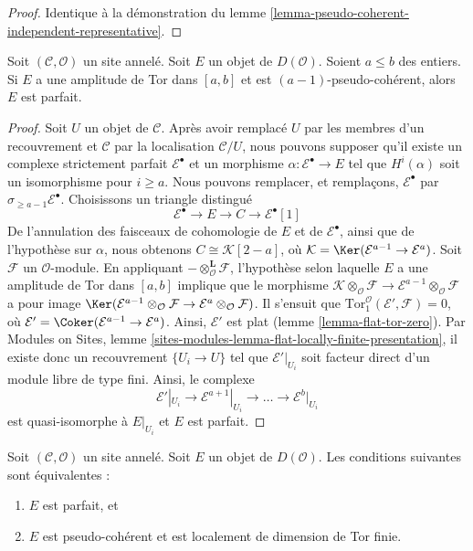 \begin{proof}
Identique à la démonstration du lemme
\ref{lemma-pseudo-coherent-independent-representative}.
\end{proof}

\begin{lemma}
\label{lemma-perfect-precise}
Soit $(\mathcal{C}, \mathcal{O})$ un site annelé. Soit $E$ un objet de
$D(\mathcal{O})$. Soient $a \leq b$ des entiers. Si $E$ a une amplitude de
Tor dans $[a, b]$ et est $(a - 1)$-pseudo-cohérent, alors $E$ est parfait.
\end{lemma}

\begin{proof}
Soit $U$ un objet de $\mathcal{C}$. Après avoir remplacé $U$ par les membres
d'un recouvrement et $\mathcal{C}$ par la localisation $\mathcal{C}/U$, nous
pouvons supposer qu'il existe un complexe strictement parfait
$\mathcal{E}^\bullet$ et un morphisme
$\alpha : \mathcal{E}^\bullet \to E$ tel que $H^i(\alpha)$ soit un
isomorphisme pour $i \geq a$. Nous pouvons remplacer, et remplaçons,
$\mathcal{E}^\bullet$ par $\sigma_{\geq a - 1}\mathcal{E}^\bullet$.
Choisissons un triangle distingué
$$
\mathcal{E}^\bullet \to E \to C \to \mathcal{E}^\bullet[1]
$$
De l'annulation des faisceaux de cohomologie de $E$ et de
$\mathcal{E}^\bullet$, ainsi que de l'hypothèse sur $\alpha$, nous obtenons
$C \cong \mathcal{K}[2 - a]$, où
$\mathcal{K} = \Ker(\mathcal{E}^{a - 1} \to \mathcal{E}^a)$. Soit
$\mathcal{F}$ un $\mathcal{O}$-module. En appliquant
$- \otimes_\mathcal{O}^\mathbf{L} \mathcal{F}$, l'hypothèse selon laquelle
$E$ a une amplitude de Tor dans $[a, b]$ implique que le morphisme
$\mathcal{K} \otimes_\mathcal{O} \mathcal{F} \to
\mathcal{E}^{a - 1} \otimes_\mathcal{O} \mathcal{F}$ a pour image
$\Ker(\mathcal{E}^{a - 1} \otimes_\mathcal{O} \mathcal{F}
\to \mathcal{E}^a \otimes_\mathcal{O} \mathcal{F})$.
Il s'ensuit que
$\text{Tor}_1^\mathcal{O}(\mathcal{E}', \mathcal{F}) = 0$, où
$\mathcal{E}' = \Coker(\mathcal{E}^{a - 1} \to \mathcal{E}^a)$. Ainsi,
$\mathcal{E}'$ est plat (lemme \ref{lemma-flat-tor-zero}). Par Modules on
Sites, lemme \ref{sites-modules-lemma-flat-locally-finite-presentation}, il
existe donc un recouvrement $\{U_i \to U\}$ tel que
$\mathcal{E}'|_{U_i}$ soit facteur direct d'un module libre de type fini.
Ainsi, le complexe
$$
\mathcal{E}'|_{U_i} \to \mathcal{E}^{a + 1}|_{U_i} \to \ldots \to
\mathcal{E}^b|_{U_i}
$$
est quasi-isomorphe à $E|_{U_i}$ et $E$ est parfait.
\end{proof}

\begin{lemma}
\label{lemma-perfect}
Soit $(\mathcal{C}, \mathcal{O})$ un site annelé. Soit $E$ un objet de
$D(\mathcal{O})$. Les conditions suivantes sont équivalentes :
\begin{enumerate}
\item $E$ est parfait, et
\item $E$ est pseudo-cohérent et est localement de dimension de Tor finie.
\end{enumerate}
\end{lemma}

